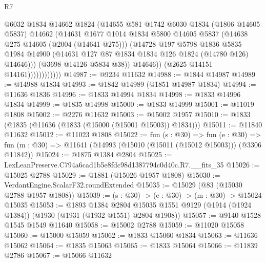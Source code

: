 \begin{lexlean}{R7}
\begin{coremodule}
                              @6032
                              @1834
                              @14662
                              @1824
                              (@14655
                                @581
                                @1742
                                @6030
                                @1834
                                (@1806 @14605 @5837)
                                @14662
                                (@14631
                                  @1677
                                  @1014
                                  @1834
                                  @5800
                                  @14605
                                  @5837
                                  (@14638 @275 @14605 (@2004 (@14641 @275)))
                                  (@14728
                                    @197
                                    @5798
                                    @1836
                                    @5835
                                    @1984
                                    @14900
                                    (@14631 @127 @87 @1834 @1834 @126 @1824 (@14780 @126) @14646)))
                                (@3698 @14126 @5834 @38))
                              @14646))
                          (@2625 @14151 @14161))))))))))))
@14987 := @9234 @11632
@14988 := @1844 @14987
@14989 := @14988 @1834
@14993 := @1842 @14989 (@1851 @14987 @1834)
@14994 := @11636 @1836
@14996 := @1833 @14994 @1834
@14998 := @1833 @14996 @1834
@14999 := @1835 @14998
@15000 := @1833 @14999
@15001 := @11019 @1808
@15002 := @2276 @11632
@15003 := @15002 @1957
@15010 := @1833 (@1835 (@11636 (@1833 (@15000 (@15001 @15003)) @1834)))
@15011 := @11840 @11632
@15012 := @11023 @1808
@15022 := fun (s : @30) =>
  fun (e : @30) => fun (m : @30) => @11641 (@14993 (@15010 (@15011 (@15012 @15003))) (@3306 @11842))
@15024 := @1875 @1384 @2804
@15025 := LexLeanPreserve.C794a6cad1b5e8fdc98d1387794c0d40c.R7.__fits_35
@15026 := @15025 @2788
@15029 := @1881 (@15026 @1957 @1808)
@15030 := VerdantEngine.ScalarF32.roundExtended
@15035 := @15029 (@83 (@15030 @2788 @1957 @1808))
@15039 := (s : @30) -> (e : @30) -> (m : @30) -> @15024 @15035
@15053 := @1893
    @1384
    @2804
    @15035
    @1551
    @9129
    (@1914 (@1924 @1384))
    (@1930 (@1931 (@1932 @1551) @2804 @1908))
@15057 := @9140 @1528 @1545 @1549 @11640
@15058 := @15002 @2788
@15059 := @11020 @15058
@15060 := @15000 @15059
@15062 := @1833 @15060 @1834
@15063 := @11636 @15062
@15064 := @1835 @15063
@15065 := @1833 @15064
@15066 := @11839 @2786
@15067 := @15066 @11632

\end{coremodule}
\end{lexlean}
